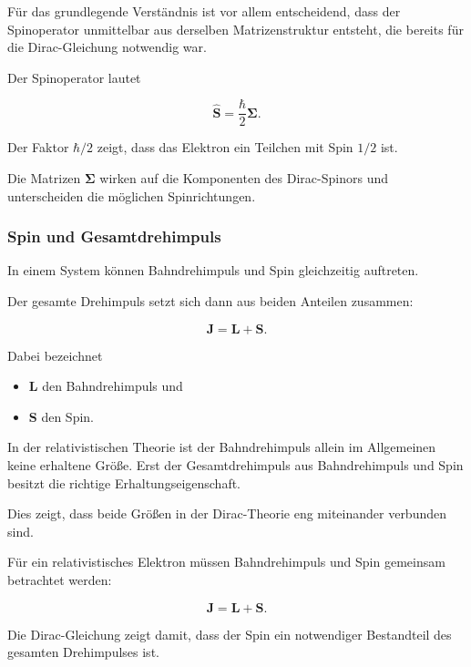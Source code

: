 Für das grundlegende Verständnis ist vor allem entscheidend, dass der
Spinoperator unmittelbar aus derselben Matrizenstruktur entsteht, die
bereits für die Dirac-Gleichung notwendig war.

\begin{MathBox}
	\label{box:spinoperator_dirac}
	
	Der Spinoperator lautet
	
	\begin{equation}
		\hat{\mathbf{S}}
		=
		\frac{\hbar}{2}
		\boldsymbol{\Sigma}.
	\end{equation}
	
	Der Faktor \(\hbar/2\) zeigt, dass das Elektron ein Teilchen mit
	Spin \(1/2\) ist.
	
	Die Matrizen \(\boldsymbol{\Sigma}\) wirken auf die Komponenten des
	Dirac-Spinors und unterscheiden die möglichen Spinrichtungen.
\end{MathBox}

\subsubsection*{Spin und Gesamtdrehimpuls}

In einem System können Bahndrehimpuls und Spin gleichzeitig auftreten.

Der gesamte Drehimpuls%
 setzt sich dann aus beiden Anteilen
zusammen:

\begin{equation}
	\mathbf{J}
	=
	\mathbf{L}
	+
	\mathbf{S}.
	\label{eq:gesamtdrehimpuls_dirac_spin}
\end{equation}

Dabei bezeichnet

\begin{itemize}
	\item \(\mathbf{L}\) den Bahndrehimpuls und
	\item \(\mathbf{S}\) den Spin.
\end{itemize}

In der relativistischen Theorie ist der Bahndrehimpuls allein im
Allgemeinen keine erhaltene Größe. Erst der Gesamtdrehimpuls aus
Bahndrehimpuls und Spin besitzt die richtige Erhaltungseigenschaft.

Dies zeigt, dass beide Größen in der Dirac-Theorie eng miteinander
verbunden sind.

\begin{PhysicsBox}
	\label{box:erhaltung_gesamtdrehimpuls_dirac}
	
	Für ein relativistisches Elektron müssen Bahndrehimpuls und Spin
	gemeinsam betrachtet werden:
	
	\begin{equation}
		\mathbf{J}
		=
		\mathbf{L}
		+
		\mathbf{S}.
	\end{equation}
	
	Die Dirac-Gleichung zeigt damit, dass der Spin ein notwendiger
	Bestandteil des gesamten Drehimpulses ist.
\end{PhysicsBox}

